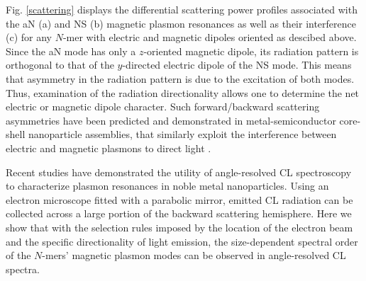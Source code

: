\documentclass[journal=apchd5,manuscript=article]{achemso}
\begin{document}
Fig. \ref{scattering} displays the differential scattering power profiles associated with the aN (a) and NS (b) magnetic plasmon resonances as well as their interference (c) for any $N$-mer with electric and magnetic dipoles oriented as descibed above. Since the aN mode has only a $z$-oriented magnetic dipole, its radiation pattern is orthogonal to that of the $y$-directed electric dipole of the NS mode. This means that asymmetry in the radiation pattern is due to the excitation of both modes. Thus, examination of the radiation directionality allows one to determine the net electric or magnetic dipole character. Such forward/backward scattering asymmetries have been predicted and demonstrated in metal-semiconductor core-shell nanoparticle assemblies, that similarly exploit the interference between electric and magnetic plasmons to direct light \cite{Kivshar2012}.


Recent studies have demonstrated the utility of angle-resolved CL spectroscopy to characterize plasmon resonances in noble metal nanoparticles\cite{Coenen2011,CoPol2011,Polman2014}. Using an electron microscope fitted with a parabolic mirror, emitted CL radiation can be collected across a large portion of the backward scattering hemisphere\cite{Coenen2011,CoPol2011,Polman2014}. Here we show that with the selection rules imposed by the location of the electron beam and the specific directionality of light emission, the size-dependent spectral order of the $N$-mers' magnetic plasmon modes can be observed in angle-resolved CL spectra. 


\end{document}

